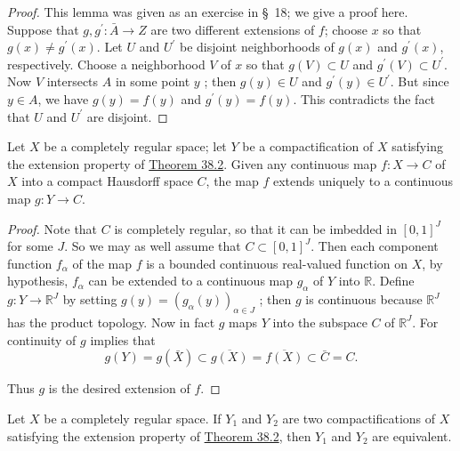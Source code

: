 \begin{proof}
 This lemma was given as an exercise in \S\ 18; we give a proof here. Suppose that \(g,g^{\prime } : \bar{A} \rightarrow Z\) are two different extensions of \(f\); choose \(x\) so that \(g(x) \neq {g}^{\prime }(x)\). Let \(U\) and \(U^{\prime }\) be disjoint neighborhoods of \(g(x)\) and \(g^{\prime }(x)\), respectively. Choose a neighborhood \(V\) of \(x\) so that \(g( V) \subset U\) and \(g^{\prime }( V) \subset {U}^{\prime }\). Now \(V\) intersects \(A\) in some point \(y\) ; then \(g(y) \in U\) and \(g^{\prime }(y) \in {U}^{\prime }\). But since \(y \in A\), we have \(g(y) = f(y)\) and \(g^{\prime }(y) = f(y)\). This contradicts the fact that \(U\) and \(U^{\prime }\) are disjoint.
\end{proof}
\begin{theorem}
\label{thm:\thetheorem}
 Let \(X\) be a completely regular space; let \(Y\) be a compactification of \(X\) satisfying the extension property of \hyperref[thm:38.2]{Theorem 38.2}. Given any continuous map \(f : X \rightarrow C\) of \(X\) into a compact Hausdorff space \(C\), the map \(f\) extends uniquely to a continuous map \(g : Y \rightarrow C\).
\end{theorem}

\begin{proof}
 Note that \(C\) is completely regular, so that it can be imbedded in \({[ 0,1] }^{J}\) for some \(J\). So we may as well assume that \(C \subset {[ 0,1] }^{J}\). Then each component function \(f_{\alpha }\) of the map \(f\) is a bounded continuous real-valued function on \(X\), by hypothesis, \(f_{\alpha }\) can be extended to a continuous map \(g_{\alpha }\) of \(Y\) into \(\mathbb{R}\). Define \(g : Y \rightarrow {\mathbb{R}}^{J}\) by setting \(g(y) = {( g_{\alpha }(y) ) }_{\alpha \in J}\) ; then \(g\) is continuous because \(\mathbb{R}^{J}\) has the product topology. Now in fact \(g\) maps \(Y\) into the subspace \(C\) of \(\mathbb{R}^{J}\). For continuity of \(g\) implies that
\[
g(Y) = g( \bar{X}) \subset \overline{g(X) } = \overline{f(X) } \subset \bar{C} = C.
\]

Thus \(g\) is the desired extension of \(f\).
\end{proof}
\begin{theorem}
\label{thm:\thetheorem}
 Let \(X\) be a completely regular space. If \(Y_{1}\) and \(Y_{2}\) are two compactifications of \(X\) satisfying the extension property of \hyperref[thm:38.2]{Theorem 38.2}, then \(Y_{1}\) and \(Y_{2}\) are equivalent.
\end{theorem}

